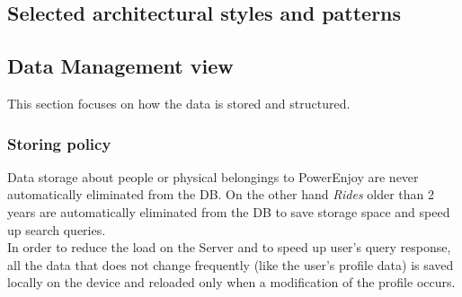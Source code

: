 \newpage
\subsection{Selected architectural styles and patterns}
\newpage

\subsection{Data Management view}
\label{sec:DMV}
This section focuses on how the data is stored and structured.
\subsubsection{Storing policy}
Data storage about people or physical belongings to PowerEnjoy are never automatically eliminated from the DB. On the other hand \emph{Rides} older than 2 years are automatically eliminated from the DB to save storage space and 
speed up search queries.\\
In order to reduce the load on the Server and to speed up user’s query
response, all the data that does not change frequently (like the user’s profile
data) is saved locally on the device and reloaded only when a modification
of the profile occurs.

